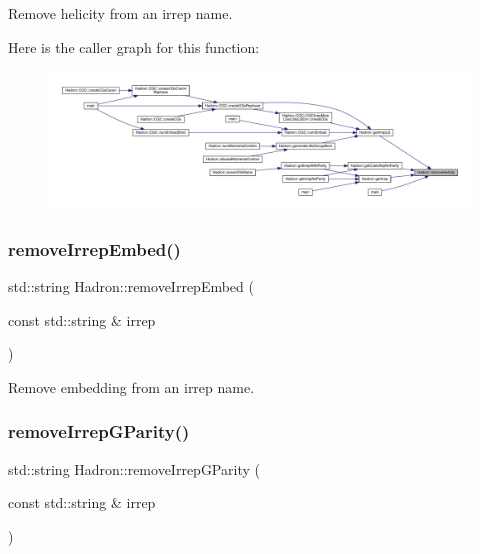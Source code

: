 Remove helicity from an irrep name. 

Here is the caller graph for this function\+:
\nopagebreak
\begin{figure}[H]
\begin{center}
\leavevmode
\includegraphics[width=350pt]{d1/daf/namespaceHadron_a877ae1e797f5cf4d4ebb7e22d5bbe69b_icgraph}
\end{center}
\end{figure}
\mbox{\label{namespaceHadron_a828226a1b80591d5791be7e1bc155220}} 
\subsubsection{\texorpdfstring{removeIrrepEmbed()}{removeIrrepEmbed()}}
{\footnotesize\ttfamily std\+::string Hadron\+::remove\+Irrep\+Embed (\begin{DoxyParamCaption}\item[{const std\+::string \&}]{irrep }\end{DoxyParamCaption})}



Remove embedding from an irrep name. 

\mbox{\label{namespaceHadron_a6c2109897dff664c15b3fe81aa7d8917}} 
\subsubsection{\texorpdfstring{removeIrrepGParity()}{removeIrrepGParity()}}
{\footnotesize\ttfamily std\+::string Hadron\+::remove\+Irrep\+G\+Parity (\begin{DoxyParamCaption}\item[{const std\+::string \&}]{irrep }\end{DoxyParamCaption})}



